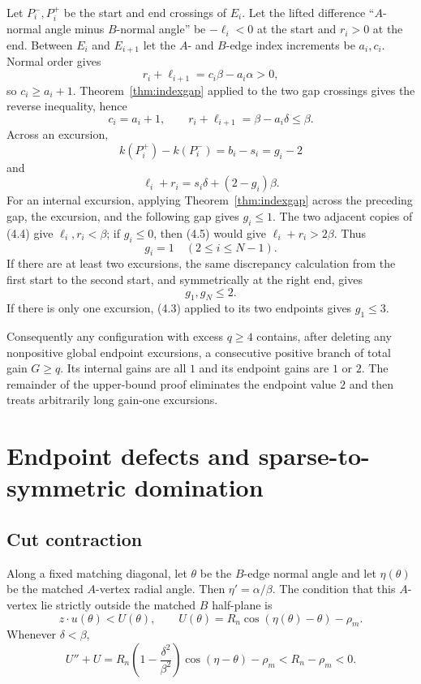 \documentclass[11pt]{article}
\theoremstyle{remark}
\begin{document}
Let $P_i^-,P_i^+$ be the start and end crossings of $E_i$. Let the lifted difference ``$A$-normal angle minus $B$-normal angle'' be $-\ell_i<0$ at the start and $r_i>0$ at the end. Between $E_i$ and $E_{i+1}$ let the $A$- and $B$-edge index increments be $a_i,c_i$. Normal order gives
\[
r_i+\ell_{i+1}=c_i\beta-a_i\alpha>0,
\]
so $c_i\ge a_i+1$. Theorem~\ref{thm:indexgap} applied to the two gap crossings gives the reverse inequality, hence
\[
\boxed{c_i=a_i+1,\qquad r_i+\ell_{i+1}=\beta-a_i\delta\le\beta.}
\tag{4.4}
\]
Across an excursion,
\[
k(P_i^+)-k(P_i^-)=b_i-s_i=g_i-2
\]
and
\[
\boxed{\ell_i+r_i=s_i\delta+(2-g_i)\beta.}
\tag{4.5}
\]
For an internal excursion, applying Theorem~\ref{thm:indexgap} across the preceding gap, the excursion, and the following gap gives $g_i\le1$. The two adjacent copies of (4.4) give $\ell_i,r_i<\beta$; if $g_i\le0$, then (4.5) would give $\ell_i+r_i>2\beta$. Thus
\[
\boxed{g_i=1\quad(2\le i\le N-1).}
\tag{4.6}
\]
If there are at least two excursions, the same discrepancy calculation from the first start to the second start, and symmetrically at the right end, gives
\[
g_1,g_N\le2.
\tag{4.7}
\]
If there is only one excursion, (4.3) applied to its two endpoints gives $g_1\le3$.

Consequently any configuration with excess $q\ge4$ contains, after deleting any nonpositive global endpoint excursions, a consecutive positive branch of total gain $G\ge q$. Its internal gains are all $1$ and its endpoint gains are $1$ or $2$. The remainder of the upper-bound proof eliminates the endpoint value $2$ and then treats arbitrarily long gain-one excursions.

\section{Endpoint defects and sparse-to-symmetric domination}\label{sec:sparse}

\subsection{Cut contraction}

Along a fixed matching diagonal, let $\theta$ be the $B$-edge normal angle and let $\eta(\theta)$ be the matched $A$-vertex radial angle. Then $\eta'=\alpha/\beta$. The condition that this $A$-vertex lie strictly outside the matched $B$ half-plane is
\[
z\cdot u(\theta)<U(\theta),\qquad
U(\theta)=R_n\cos(\eta(\theta)-\theta)-\rho_m.
\]
Whenever $\delta<\beta$,
\[
U''+U
=R_n\left(1-\frac{\delta^2}{\beta^2}\right)\cos(\eta-\theta)-\rho_m
<R_n-\rho_m<0.
\]
\end{document}
